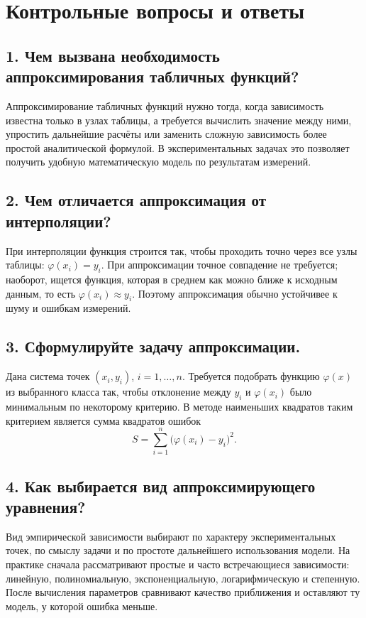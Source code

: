 \documentclass[a4paper,12pt]{article}
\begin{document}
\section*{Контрольные вопросы и ответы}

\subsection*{1. Чем вызвана необходимость аппроксимирования табличных функций?}

Аппроксимирование табличных функций нужно тогда, когда зависимость известна только в узлах таблицы, а требуется вычислить значение между ними, упростить дальнейшие расчёты или заменить сложную зависимость более простой аналитической формулой. В экспериментальных задачах это позволяет получить удобную математическую модель по результатам измерений.

\subsection*{2. Чем отличается аппроксимация от интерполяции?}

При интерполяции функция строится так, чтобы проходить точно через все узлы таблицы: $\varphi(x_i)=y_i$. При аппроксимации точное совпадение не требуется; наоборот, ищется функция, которая в среднем как можно ближе к исходным данным, то есть $\varphi(x_i)\approx y_i$. Поэтому аппроксимация обычно устойчивее к шуму и ошибкам измерений.

\subsection*{3. Сформулируйте задачу аппроксимации.}

Дана система точек $(x_i,y_i)$, $i=1,\dots,n$. Требуется подобрать функцию $\varphi(x)$ из выбранного класса так, чтобы отклонение между $y_i$ и $\varphi(x_i)$ было минимальным по некоторому критерию. В методе наименьших квадратов таким критерием является сумма квадратов ошибок
\[
S = \sum_{i=1}^{n}\bigl(\varphi(x_i)-y_i\bigr)^2.
\]

\subsection*{4. Как выбирается вид аппроксимирующего уравнения?}

Вид эмпирической зависимости выбирают по характеру экспериментальных точек, по смыслу задачи и по простоте дальнейшего использования модели. На практике сначала рассматривают простые и часто встречающиеся зависимости: линейную, полиномиальную, экспоненциальную, логарифмическую и степенную. После вычисления параметров сравнивают качество приближения и оставляют ту модель, у которой ошибка меньше.
\end{document}
